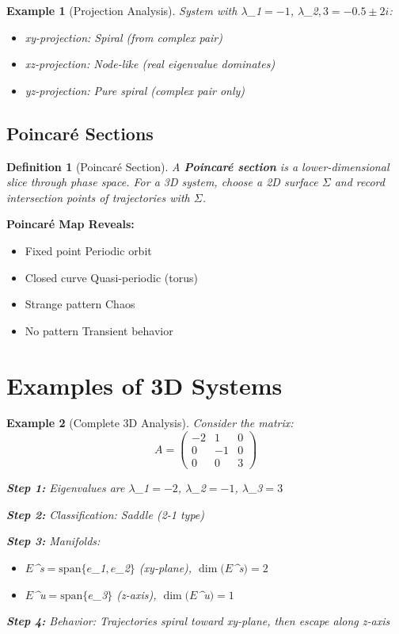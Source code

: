\documentclass[12pt]{article}
\newtheorem{definition}{Definition}
\newtheorem{example}{Example}
\begin{document}
\begin{example}[Projection Analysis]
System with $\lambda$_{1}$ = -1$, $\lambda$_{2}$,3 = -0.5 \pm 2i$:
\begin{itemize}
    \item xy-projection: Spiral (from complex pair)
    \item xz-projection: Node-like (real eigenvalue dominates)
    \item yz-projection: Pure spiral (complex pair only)
\end{itemize}
\end{example}

\subsection{Poincaré Sections}

\begin{definition}[Poincaré Section]
A \textbf{Poincaré section} is a lower-dimensional slice through phase space. For a 3D system, choose a 2D surface $\Sigma$ and record intersection points of trajectories with $\Sigma$.
\end{definition}

\begin{insight}
\textbf{Poincaré Map Reveals:}
\begin{itemize}
    \item Fixed point \rightarrow Periodic orbit
    \item Closed curve \rightarrow Quasi-periodic (torus)
    \item Strange pattern \rightarrow Chaos
    \item No pattern \rightarrow Transient behavior
\end{itemize}
\end{insight}

\section{Examples of 3D Systems}

\begin{example}[Complete 3D Analysis]
Consider the matrix:
$$A = \begin{pmatrix} -2 & 1 & 0 \\ 0 & -1 & 0 \\ 0 & 0 & 3 \end{pmatrix}$$

\textbf{Step 1:} Eigenvalues are $\lambda$_{1}$ = -2$, $\lambda$_{2}$ = -1$, $\lambda$_{3}$ = 3$

\textbf{Step 2:} Classification: Saddle (2-1 type)

\textbf{Step 3:} Manifolds:
\begin{itemize}
    \item $E$^{s}$ = \text{span}\{e$_{1}$, e$_{2}$\}$ (xy-plane), $\dim(E$^{s}$) = 2$
    \item $E$^{u}$ = \text{span}\{e$_{3}$\}$ (z-axis), $\dim(E$^{u}$) = 1$
\end{itemize}

\textbf{Step 4:} Behavior: Trajectories spiral toward xy-plane, then escape along z-axis
\end{example}
\end{document}
